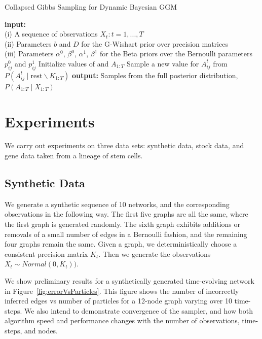 \documentclass{article}
\begin{document}
\begin{algorithm}[h!tbp]
\caption{Collapsed Gibbs Sampling for Dynamic Bayesian GGM}
\label{alg:gibbs}
\begin{algorithmic}[1]
\STATE \textbf{input:} \\(i) A sequence of observations $X_t : t = 1,...,T$ \\(ii) Parameters $b$ and $D$ for the G-Wishart prior over precision matrices \\(iii) Parameters $\alpha^0$, $\beta^0$, $\alpha^1$, $\beta^1$ for the Beta priors over the Bernoulli parameters $p_{ij}^0$ and $p_{ij}^1$ %
\STATE Initialize values of and $A_{1:T}$
\STATE Sample a new value for $A_{ij}^t$ from $P(A_{ij}^t \mid \text{rest} \backslash K_{1:T})$
\ENDFOR
\ENDFOR
\ENDWHILE
\STATE \textbf{output:} Samples from the full posterior distribution, $P(A_{1:T} \mid X_{1:T})$
\end{algorithmic}
\label{alg:gibbs}
\end{algorithm}

\section{Experiments}
\label{sec:exp}

We carry out experiments on three data sets: synthetic data, stock data, and gene data taken from a lineage of stem cells.

\subsection{Synthetic Data}
We generate a synthetic sequence of 10 networks, and the corresponding observations in the following way. The first five graphs are all the same, where the first graph is generated randomly. The sixth graph exhibits additions or removals of a small number of edges in a Bernoulli fashion, and the remaining four graphs remain the same. Given a graph, we deterministically choose a consistent precision matrix $K_t$. Then we generate the observations $X_t \sim Normal(0,K_t))$.

We show preliminary results for a synthetically generated time-evolving network in Figure~\ref{fig:errorVsParticles}. This figure shows the number of incorrectly inferred edges vs number of particles for a 12-node graph varying over 10 time-steps. We also intend to demonstrate convergence of the sampler, and how both algorithm speed and performance changes with the number of observations, time-steps, and nodes.
\end{document}
